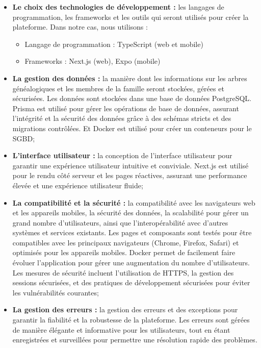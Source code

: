 \begin{itemize}
  \item \textbf{Le choix des technologies de développement :} les langages de
    programmation, les frameworks et les outils qui seront utilisés pour créer
    la plateforme. Dans notre cas, nous utilisons :
    \begin{itemize}
      \item Langage de programmation : TypeScript (web et mobile)
      \item Frameworks : Next.js (web), Expo (mobile)
    \end{itemize}

  \item \textbf{La gestion des données :} la manière dont les informations sur les
    arbres généalogiques et les membres de la famille seront stockées, gérées
    et sécurisées. Les données sont stockées dans une base de données
    PostgreSQL. Prisma est utilisé pour gérer les opérations de base de
    données, assurant l'intégrité et la sécurité des données grâce à des
    schémas stricts et des migrations contrôlées. Et Docker est utilisé pour
    créer un conteneurs pour le \ac{SGBD};

  \item \textbf{L’interface utilisateur :} la conception de l’interface utilisateur
    pour garantir une expérience utilisateur intuitive et conviviale.
    Next.js est utilisé pour le rendu côté serveur et les pages réactives,
    assurant une performance élevée et une expérience utilisateur fluide;

  \item \textbf{La compatibilité et la sécurité :} la compatibilité avec les navigateurs
    web et les appareils mobiles, la sécurité des données, la scalabilité pour
    gérer un grand nombre d’utilisateurs, ainsi que l’interopérabilité avec
    d’autres systèmes et services existants. Les pages et composants sont
    testés pour être compatibles avec les principaux navigateurs
    (Chrome, Firefox, Safari) et optimisés pour les appareils mobiles. Docker
    permet de facilement faire évoluer l'application pour gérer une augmentation du
    nombre d'utilisateurs. Les mesures de sécurité incluent l'utilisation de
    HTTPS, la gestion des sessions sécurisées, et des pratiques de développement
    sécurisées pour éviter les vulnérabilités courantes;

  \item \textbf{La gestion des erreurs :} la gestion des erreurs et des exceptions
    pour garantir la fiabilité et la robustesse de la plateforme. Les erreurs
    sont gérées de manière élégante et informative pour les utilisateurs, tout
    en étant enregistrées et surveillées pour permettre une résolution rapide
    des problèmes.

\end{itemize}

